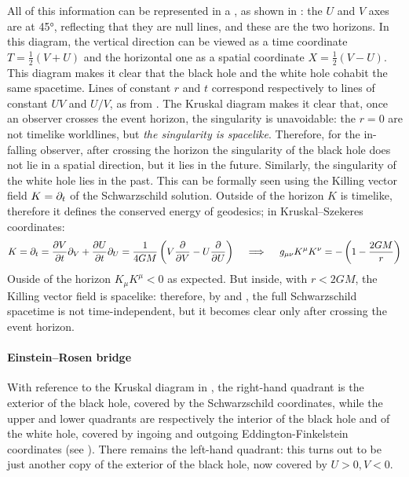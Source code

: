 All of this information can be represented in a , as shown in : the $ U $ and $ V $ axes are at 45°, reflecting that they are null lines, and these are the two horizons. In this diagram, the vertical direction can be viewed as a time coordinate $ T = \frac{1}{2} (V + U) $ and the horizontal one as a spatial coordinate $ X = \frac{1}{2} (V - U) $. This diagram makes it clear that the black hole and the white hole cohabit the same spacetime. Lines of constant $ r $ and $ t $ correspond respectively to lines of constant $ UV $ and $ U/V $, as from .
The Kruskal diagram makes it clear that, once an observer crosses the event horizon, the singularity is unavoidable: the $ r = 0 $ are not timelike worldlines, but \textit{the singularity is spacelike}. Therefore, for the in-falling observer, after crossing the horizon the singularity of the black hole does not lie in a spatial direction, but it lies in the future. Similarly, the singularity of the white hole lies in the past. This can be formally seen using the Killing vector field $ K = \partial_t $ of the Schwarzschild solution. Outside of the horizon $ K $ is timelike, therefore it defines the conserved energy of geodesics; in Kruskal--Szekeres coordinates:
\begin{equation*}
  K = \partial_t = \frac{\partial V}{\partial t} \partial_V + \frac{\partial U}{\partial t} \partial_U = \frac{1}{4GM} \left( V \frac{\partial}{\partial V} - U \frac{\partial}{\partial U} \right)
  \quad \implies \quad
  g_{\mu \nu} K^\mu K^\nu = - \left( 1 - \frac{2GM}{r} \right)
\end{equation*}
Ouside of the horizon $ K_\mu K^\mu < 0 $ as expected. But inside, with $ r < 2GM $, the Killing vector field is spacelike: therefore, by  and , the full Schwarzschild spacetime is not time-independent, but it becomes clear only after crossing the event horizon.

\paragraph{Einstein--Rosen bridge}

With reference to the Kruskal diagram in , the right-hand quadrant is the exterior of the black hole, covered by the Schwarzschild coordinates, while the upper and lower quadrants are respectively the interior of the black hole and of the white hole, covered by ingoing and outgoing Eddington-Finkelstein coordinates (see ). There remains the left-hand quadrant: this turns out to be just another copy of the exterior of the black hole, now covered by $ U > 0, V < 0 $.

